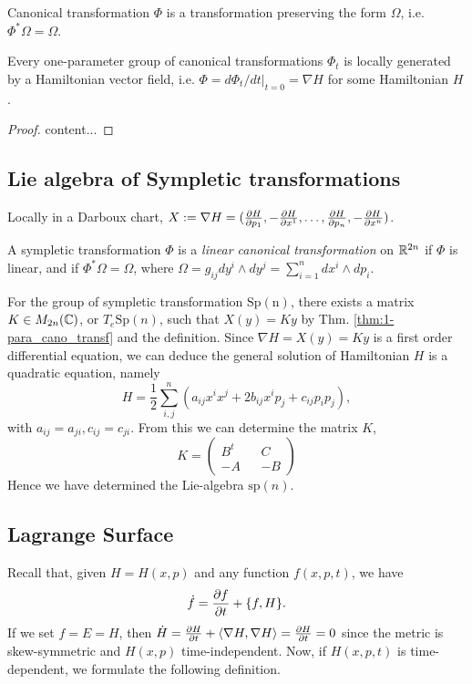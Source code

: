 \begin{definition}
	Canonical transformation $\Phi$ is a transformation preserving the form $\Omega$, i.e. $\Phi^* \Omega = \Omega$.
\end{definition}

\begin{theorem}
	Every one-parameter group of canonical transformations $\Phi_t$ is locally generated by a Hamiltonian vector field, i.e. $\Phi = d \Phi_t/ dt|_{t = 0} = \nabla H$ for some Hamiltonian $H$.
	\label{thm:1-para_cano_transf}
\end{theorem}
\begin{proof}
	content...
\end{proof}

\subsection{Lie algebra of Sympletic transformations}
Locally in a Darboux chart, $X := \nabla H = (\frac{ \partial H}{ \partial p_1 }, - \frac{ \partial H}{ \partial x^1 }, \dots, \frac{ \partial H}{ \partial p_n }, - \frac{ \partial H}{ \partial x^n })$.
\begin{definition}
	A sympletic transformation $\Phi$ is a \emph{linear canonical transformation} on $\mathbb{R}^{2n}$ if $\Phi$ is linear, and if $\Phi^* \Omega = \Omega$, where $\Omega = g_{ij} dy^i \wedge dy^j = \sum_{i = 1}^{n} dx^i \wedge dp_i$.
\end{definition}

For the group of sympletic transformation $\mathrm{Sp(n)}$, there exists a matrix $K \in M_{2n}(\mathbb{C})$, or $T_{e}\mathrm{Sp}(n)$, such that $X(y) = Ky$ by Thm. \ref{thm:1-para_cano_transf} and the definition. Since $\nabla H = X(y) = Ky$ is a first order differential equation, we can deduce the general solution of Hamiltonian $H$ is a quadratic equation, namely
\[ H = \frac{1}{2} \sum_{i, j}^{n} \left( a_{ij}x^ix^j + 2b_{ij} x^ip_j + c_{ij}p_ip_j \right), \]
with $a_{ij} = a_{ji}, c_{ij} = c_{ji}$. From this we can determine the matrix $K$,
\[K=
\begin{pmatrix}
B^t  &&  C \\
-A   && -B 
\end{pmatrix}\]
Hence we have determined the Lie-algebra $\mathrm{sp}(n)$.

\subsection{Lagrange Surface}
Recall that, given $H = H(x, p)$ and any function $f(x, p, t)$, we have
\[ \dot{f} = \frac{ \partial f}{ \partial t } + \{ f, H \}. \]
If we set $f = E = H$, then $\dot{H} = \frac{ \partial H}{ \partial t } + \left< \nabla H, \nabla H \right> = \frac{ \partial H}{ \partial t } = 0$ since the metric is skew-symmetric and $H(x, p)$ time-independent. Now, if $H(x, p, t)$ is time-dependent, we formulate the following definition.


